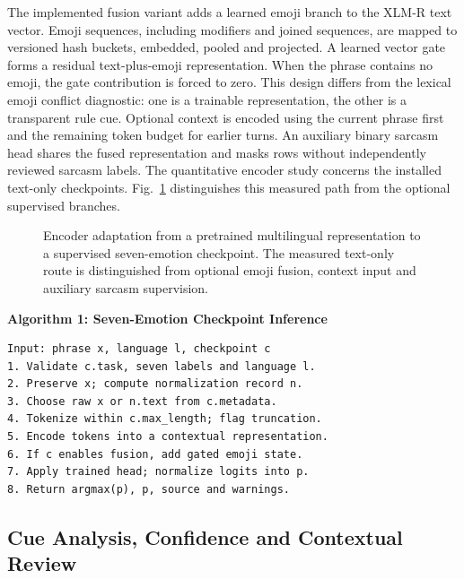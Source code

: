 \documentclass[journal]{IEEEtran}
\begin{document}
The implemented fusion variant adds a learned emoji branch to the XLM-R text vector. Emoji sequences, including modifiers and joined sequences, are mapped to versioned hash buckets, embedded, pooled and projected. A learned vector gate forms a residual text-plus-emoji representation. When the phrase contains no emoji, the gate contribution is forced to zero. This design differs from the lexical emoji conflict diagnostic: one is a trainable representation, the other is a transparent rule cue. Optional context is encoded using the current phrase first and the remaining token budget for earlier turns. An auxiliary binary sarcasm head shares the fused representation and masks rows without independently reviewed sarcasm labels. The quantitative encoder study concerns the installed text-only checkpoints. Fig.~\ref{fig:encoder_adaptation} distinguishes this measured path from the optional supervised branches.

\begin{figure}[!t]
\centering
\resizebox{.84\textwidth}{!}{}
\caption{Encoder adaptation from a pretrained multilingual representation to a supervised seven-emotion checkpoint. The measured text-only route is distinguished from optional emoji fusion, context input and auxiliary sarcasm supervision.}\label{fig:encoder_adaptation}
\end{figure}


\par\smallskip\noindent\begin{minipage}[t]{\columnwidth}
\textbf{Algorithm 1: Seven-Emotion Checkpoint Inference}
\begin{lstlisting}
Input: phrase x, language l, checkpoint c
1. Validate c.task, seven labels and language l.
2. Preserve x; compute normalization record n.
3. Choose raw x or n.text from c.metadata.
4. Tokenize within c.max_length; flag truncation.
5. Encode tokens into a contextual representation.
6. If c enables fusion, add gated emoji state.
7. Apply trained head; normalize logits into p.
8. Return argmax(p), p, source and warnings.
\end{lstlisting}
\end{minipage}\par\smallskip

\subsection{Cue Analysis, Confidence and Contextual Review}
\end{document}
